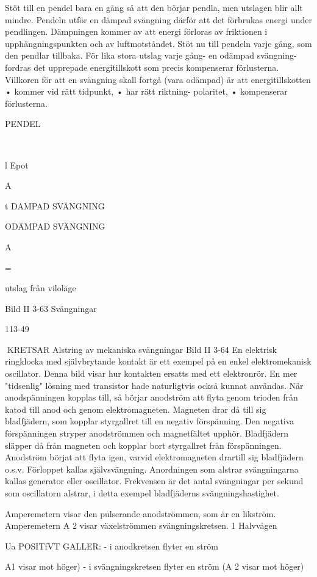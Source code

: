 \documentclass[a4paper,twoside,twocolumn,openright]{book}
\begin{document}
{{{{{{{Stöt till en pendel bara en gång så att den
börjar pendla, men utslagen blir allt mindre.
Pendeln utför en dämpad svängning därför
att det förbrukas energi under pendlingen.
Dämpningen kommer av att energi förloras av friktionen i upphängningspunkten och
av luftmotståndet.
Stöt nu till pendeln varje gång, som den
pendlar tillbaka. För lika stora utslag varje
gång- en odämpad svängning- fordras det
upprepade energitillskott som precis kompenserar förlusterna.
Villkoren för att en svängning skall fortgå
(vara odämpad) är att energitillskotten
• kommer vid rätt tidpunkt,
• har rätt riktning- polaritet,
• kompenserar förlusterna.

PENDEL

\

l
Epot

A

t
DAMPAD SVÄNGNING

ODÄMPAD SVÄNGNING

A

=

utslag från viloläge

Bild II 3-63 Svängningar

113-49

KRETSAR
Alstring av mekaniska svängningar
Bild II 3-64
En elektrisk ringklocka med självbrytande
kontakt är ett exempel på en enkel elektromekanisk oscillator. Denna bild visar hur
kontakten ersatts med ett elektronrör. En
mer "tidsenlig" lösning med transistor hade
naturligtvis också kunnat användas.
När anodspänningen kopplas till, så börjar anodström att flyta genom trioden från
katod till anod och genom elektromagneten.
Magneten drar då till sig bladfjädern, som
kopplar styrgallret till en negativ förspänning.
Den negativa förspänningen stryper anodströmmen och magnetfältet upphör. Bladfjädern släpper då från magneten och kopplar
bort styrgallret från förspänningen. Anodström börjat att flyta igen, varvid elektromagneten drartill sig bladfjädern o.s.v. Förloppet
kallas självsvängning.
Anordningen som alstrar svängningarna
kallas generator eller oscillator. Frekvensen
är det antal svängningar per sekund som
oscillatorn alstrar, i detta exempel bladfjäderns svängningshastighet.

Amperemetern
visar den pulserande
anodströmmen, som är en likström.
Amperemetern A 2 visar växelströmmen
svängningskretsen.
1 Halvvågen

Ua
POSITfVT GALLER:
- i anodkretsen flyter en ström
{A1 visar mot höger)
- i svängningskretsen flyter en ström
(A 2 visar mot höger)

}}}}}}}}
\end{document}
